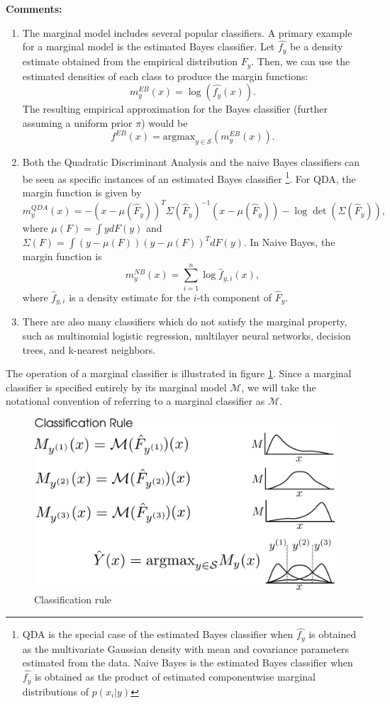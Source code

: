\documentclass[12pt]{article}
\begin{document}
\textbf{Comments:}
\begin{enumerate}
\item The marginal model includes several popular classifiers.
A primary example for a marginal model is the estimated Bayes
classifier. Let $\hat{f_y}$ be a density estimate obtained from the
empirical distribution $\hat{F_y}$. Then, we can use the estimated
densities of each class to produce the margin functions:
\[ m^{EB}_y(x) = \log(\hat{f_{y}}(x)).\]
The resulting empirical approximation for the Bayes classifier
(further assuming a uniform prior $\pi$) would be
\[ f^{EB}(x) = \text{argmax}_{y \in \mathcal{S}}(m^{EB}_y(x)).\]
\item Both the Quadratic Discriminant Analysis and the naive Bayes classifiers can be seen as specific instances of an estimated Bayes classifier
\footnote{QDA is the special case of the estimated Bayes classifier when $\hat{f_y}$ is obtained as
the multivariate Gaussian density with mean and covariance parameters estimated from the data.
Naive Bayes is the estimated Bayes classifier when $\hat{f_y}$ is obtained as the product of estimated componentwise marginal distributions
of $p(x_i|y)$}. 
For QDA, the margin function is
given by
\[
m_y^{QDA}(x) = -(x - \mu(\hat{F}_y))^T \Sigma(\hat{F}_y)^{-1} (x-\mu(\hat{F}_y)) - \log\det(\Sigma(\hat{F}_y)),
\]
where $\mu(F) = \int y dF(y)$ and $\Sigma(F) = \int (y-\mu(F))(y-\mu(F))^T dF(y)$.
In Naive Bayes, the margin function is
\[
m^{NB}_y(x) = \sum_{i=1}^n \log \hat{f}_{y, i}(x),
\]
where $\hat{f}_{y, i}$ is a density estimate for the $i$-th component of
$\hat{F}_y$.
\item There are also many classifiers which do not satisfy the marginal property, such as multinomial logistic regression,
multilayer neural networks, decision trees, and k-nearest neighbors.
\end{enumerate}

The operation of a marginal classifier is illustrated in figure
\ref{fig:classification_rule}.  Since a marginal classifier is
specified entirely by its marginal model $\mathcal{M}$, we will take
the notational convention of referring to a marginal classifier as
$\mathcal{M}$.

\begin{figure}[h]
\centering
\includegraphics[scale = 0.4]{classification_rule.png}
\caption{Classification rule}\label{fig:classification_rule}
\end{figure}
\end{document}
